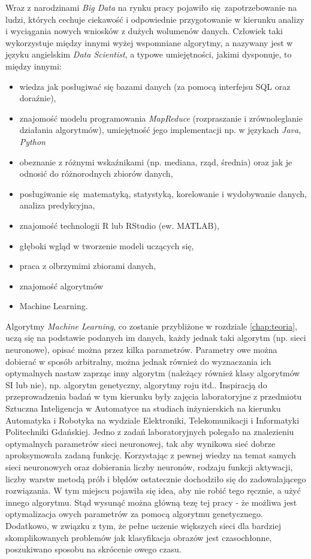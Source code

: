 Wraz z narodzinami \textit{Big Data} na rynku pracy pojawiło się zapotrzebowanie na ludzi, których cechuje ciekawość i odpowiednie przygotowanie w kierunku analizy i wyciągania nowych wniosków z dużych wolumenów danych.
Człowiek taki wykorzystuje między innymi wyżej wspomniane algorytmy, a nazywany jest w języku angielskim \textit{Data Scientist}, a typowe umiejętności, jakimi dysponuje, to między innymi:
\begin{itemize}
	\item wiedza jak posługiwać się bazami danych (za pomocą interfejsu SQL oraz doraźnie),
	\item znajomość modelu programowania \textit{MapReduce} (rozpraszanie i zrównoleglanie działania algorytmów), umiejętność jego implementacji np. w językach \textit{Java}, \textit{Python}
	\item obeznanie z różnymi wskaźnikami (np. mediana, rząd, średnia) oraz jak je odnosić do różnorodnych zbiorów danych,
	\item posługiwanie się matematyką, statystyką, korelowanie i wydobywanie danych, analiza predykcyjna,
	\item znajomość technologii R lub RStudio (ew. MATLAB),
	\item głęboki wgląd w tworzenie modeli uczących się,
	\item praca z olbrzymimi zbiorami danych,
	\item znajomość algorytmów \item{Machine Learning}. \cite{venu2012}
\end{itemize}

Algorytmy \textit{Machine Learning}, co zostanie przybliżone w rozdziale \ref{chap:teoria}, uczą się na podstawie podanych im danych, każdy jednak taki algorytm (np. sieci neuronowe), opisać można przez kilka parametrów.
Parametry owe można dobierać w sposób arbitralny, można jednak również do wyznaczania ich optymalnych nastaw zaprząc inny algorytm (należący również klasy algorytmów SI lub nie), np. algorytm genetyczny, algorytmy roju itd..
Inspiracją do przeprowadzenia badań w tym kierunku były zajęcia laboratoryjne z przedmiotu Sztuczna Inteligencja w Automatyce na studiach inżynierskich na kierunku Automatyka i Robotyka na wydziale Elektroniki, Telekomunikacji i Informatyki Politechniki Gdańskiej.
Jedno z zadań laboratoryjnych polegało na znalezieniu optymalnych parametrów sieci neuronowej, tak aby wynikowa sieć dobrze aproksymowała zadaną funkcję.
Korzystając z pewnej wiedzy na temat samych sieci neuronowych oraz dobierania liczby neuronów, rodzaju funkcji aktywacji, liczby warstw metodą prób i błędów ostatecznie dochodziło się do zadowalającego rozwiązania.
W tym miejscu pojawiła się idea, aby nie robić tego ręcznie, a użyć innego algorytmu.
Stąd wysunąć można główną tezę tej pracy - że możliwa jest optymalizacja owych parametrów za pomocą algorytmu genetycznego.
Dodatkowo, w związku z tym, że pełne uczenie większych sieci dla bardziej skomplikowanych problemów jak klasyfikacja obrazów jest czasochłonne, poszukiwano sposobu na skrócenie owego czasu.

